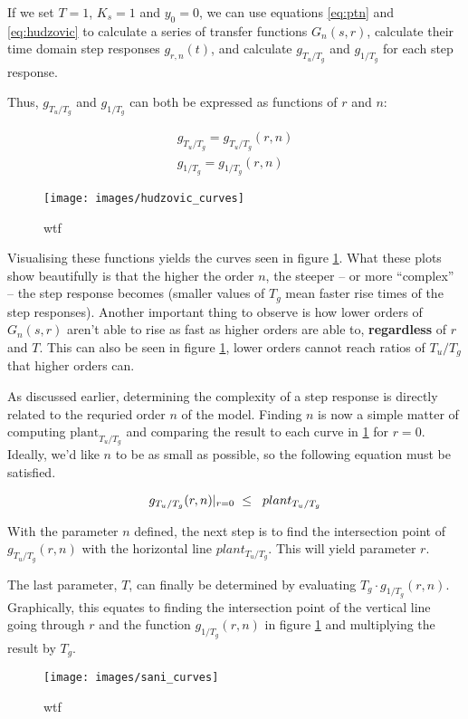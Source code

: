 If we set $T=1$, $K_s=1$ and $y_0=0$, we  can  use  equations  \ref{eq:ptn}  and
\ref{eq:hudzovic} to  calculate  a  series  of  transfer  functions  $G_n(s,r)$,
calculate  their  time  domain  step  responses   $g_{r,n}(t)$,   and  calculate
$g_{T_u/T_g}$ and $g_{1/T_g}$ for each step response.

Thus, $g_{T_u/T_g}$ and $g_{1/T_g}$ can both be expressed as  functions  of  $r$
and $n$:

\begin{align}
    g_{T_u/T_g} = g_{T_u/T_g}(r, n) \\
    g_{1/T_g}  =  g_{1/T_g}(r,n)
\end{align}

\begin{figure}
    \texttt{[image: images/hudzovic\_curves]}
    \caption{wtf}
    \label{fig:hudzovic}
\end{figure}

Visualising these functions yields the curves seen in figure \ref{fig:hudzovic}.
What these plots show beautifully  is that the higher the order $n$, the steeper
-- or more  ``complex''  --  the  step response becomes (smaller values of $T_g$
mean faster rise times of the step responses).
Another important thing to observe is how lower orders of $G_n(s,r)$ aren't able
to  rise  as  fast as higher orders are able to, \textbf{regardless} of $r$  and
$T$. This can  also  be  seen  in figure \ref{fig:hudzovic}, lower orders cannot
reach ratios of $T_u/T_g$ that higher orders can.


As discussed earlier, determining the  complexity of a step response is directly
related  to  the  requried  order $n$ of the model. Finding $n$ is now a  simple
matter of  computing $\textrm{plant}_{T_u/T_g}$ and comparing the result to each
curve in \ref{fig:hudzovic} for $r=0$. Ideally, we'd like  $n$ to be as small as
possible, so the following equation must be satisfied.

\begin{equation}
    g_{T_u/T_g}(r, n)\lvert_{r=0} \hspace{2mm} \le \hspace{2mm} plant_{T_u/T_g}
\end{equation}

With the  parameter $n$ defined, the next step is to find the intersection point
of  $g_{T_u/T_g}(r, n)$ with the horizontal line  $plant_{T_u/T_g}$.  This  will
yield parameter $r$.

The last parameter, $T$,  can  finally  be  determined  by evaluating $T_g \cdot
g_{1/T_g}(r, n)$. Graphically, this equates to finding the intersection point of
the vertical line going through $r$ and the function $g_{1/T_g}(r, n)$ in figure
\ref{fig:hudzovic} and multiplying the result by $T_g$.

\begin{figure}
    \texttt{[image: images/sani\_curves]}
    \caption{wtf}
    \label{fig:sani}
\end{figure}


